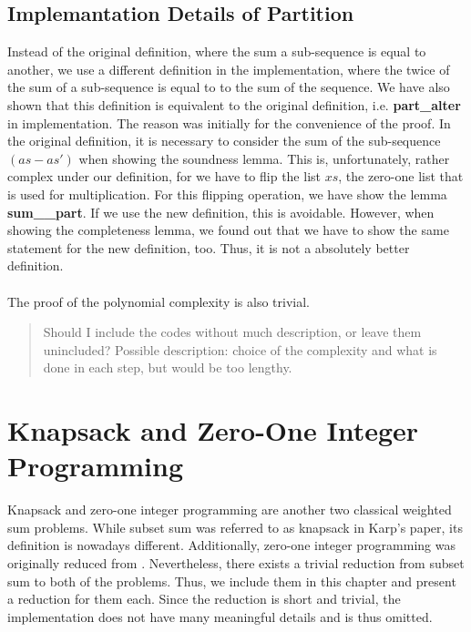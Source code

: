 \subsection{Implemantation Details of Partition}
Instead of the original definition, where the sum a sub-sequence is equal to another, we use a different definition in the implementation,
where the twice of the sum of a sub-sequence is equal to to the sum of the sequence. We have also shown that this definition is equivalent 
to the original definition, i.e. \textbf{part\_alter} in implementation. 
The reason was initially for the convenience of the proof. 
In the original definition, it is necessary to consider the sum of the sub-sequence $(as - as')$ when showing the soundness lemma. This is, unfortunately, 
rather complex under our definition, for we have to flip the list $xs$, the zero-one list that is used for multiplication. For this 
flipping operation, we have show the lemma \textbf{sum\_\binary\_part}. If we use the new definition, this is avoidable.
However, when showing the completeness lemma, we found out that we have to show the same statement for the new definition, too. 
Thus, it is not a absolutely better definition. \\\\
The proof of the polynomial complexity is also trivial. 
\begin{quote}
    Should I include the codes without much description, or leave them unincluded? 
    Possible description: choice of the complexity and what is done in each step, but would be too lengthy.
\end{quote}

\section{Knapsack and Zero-One Integer Programming}
Knapsack and zero-one integer programming are another two classical weighted sum problems. While subset sum was referred 
to as knapsack in Karp's paper, its definition is nowadays different. Additionally, zero-one integer programming 
was originally reduced from \SAT. Nevertheless, there exists a trivial reduction from subset sum to both of the problems. Thus, 
we include them in this chapter and present a reduction for them each. 
Since the reduction is short and trivial, the implementation does not have 
many meaningful details and is thus omitted. 

